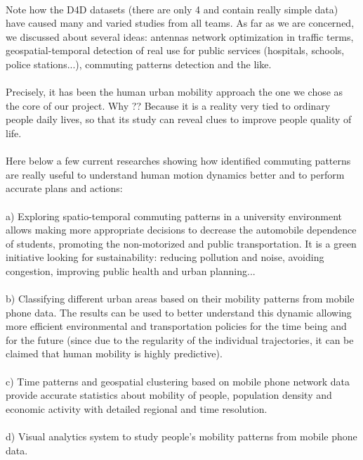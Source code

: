 \\
Note how the D4D datasets (there are only 4 and contain really simple data) have caused many and varied studies from all teams. As far as we are concerned, we discussed about several ideas: antennas network optimization in traffic terms, geospatial-temporal detection of real use for public services (hospitals, schools, police stations...), commuting patterns detection and the like.
\\
\\
Precisely, it has been the human urban mobility approach the one we chose as the core of our project. Why ?? Because it is a reality very tied to ordinary people daily lives, so that its study can reveal clues to improve people quality of life.
\\
\\
Here below a few current researches showing how identified commuting patterns are really useful to understand human motion dynamics better and to perform accurate plans and actions:
\\
\\
a) Exploring spatio-temporal commuting patterns in a university environment allows making more appropriate decisions to decrease the automobile dependence of students, promoting the non-motorized and public transportation. It is a green initiative looking for sustainability: reducing pollution and noise, avoiding congestion, improving public health and urban planning...
\\
\\
b) Classifying different urban areas based on their mobility patterns from mobile phone data. The results can be used to better understand this dynamic allowing more efficient environmental and transportation policies for the time being and for the future (since due to the regularity of the individual trajectories, it can be claimed that human mobility is highly predictive).
\\
\\
c) Time patterns and geospatial clustering based on mobile phone network data provide accurate statistics about mobility of people, population density and economic activity with detailed regional and time resolution.
\\
\\
d) Visual analytics system to study people's mobility patterns from mobile phone data.
\\
\\